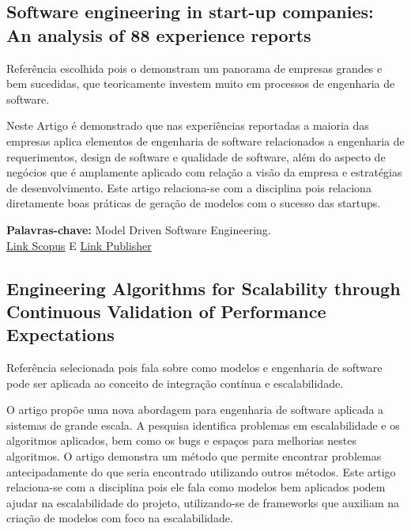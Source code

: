 \documentclass{article}
\begin{document}
\subsection{Software engineering in start-up companies: An analysis of 88 experience reports}
Referência escolhida pois o demonstram um panorama de empresas grandes e bem sucedidas, que teoricamente investem muito em processos de engenharia de software.\par
Neste Artigo \citep{Klotins2019} é demonstrado que nas experiências reportadas a maioria das empresas aplica elementos de engenharia de software relacionados a engenharia de requerimentos, design de software e qualidade de software, além do aspecto de negócios que é amplamente aplicado com relação a visão da empresa e estratégias de desenvolvimento. Este artigo relaciona-se com a disciplina pois relaciona diretamente boas práticas de geração de modelos com o sucesso das startups. \par

\textbf{Palavras-chave:} Model Driven Software Engineering.\\
\href{https://www.scopus.com/record/display.uri?eid=2-s2.0-85047198507&origin=resultslist&sort=plf-f&src=s&st1=%22software+engineering%22&st2=%22Validation%22+or+%22Verification%22+or+%22rastreability%22+or+%22other+applications%22&nlo=&nlr=&nls=&sid=9ffc2a7f5123c053c2fc0e6507d97681&sot=b&sdt=b&sl=122&s=%28TITLE-ABS-KEY%28%22software+engineering%22%29+AND+ALL%28%22Validation%22+or+%22Verification%22+or+%22rastreability%22+or+%22other+applications%22%29%29&relpos=57&citeCnt=2&searchTerm=}{Link Scopus} E
\href{https://link.springer.com/article/10.1007%2Fs10664-018-9620-y}{Link Publisher}

\subsection{Engineering Algorithms for Scalability through Continuous Validation of Performance Expectations}
Referência selecionada pois fala sobre como modelos e engenharia de software pode ser aplicada ao conceito de integração contínua e escalabilidade. \par
O artigo \cite{8632716} propõe uma nova abordagem para engenharia de software aplicada a sistemas de grande escala. A pesquisa identifica problemas em escalabilidade e os algoritmos aplicados, bem como os bugs e espaços para melhorias nestes algoritmos. O artigo demonstra um método que permite encontrar problemas antecipadamente do que seria encontrado utilizando outros métodos. Este artigo relaciona-se com a disciplina pois ele fala como modelos bem aplicados podem ajudar na escalabilidade do projeto, utilizando-se de frameworks que auxiliam na criação de modelos com foco na escalabilidade. \par
\end{document}
